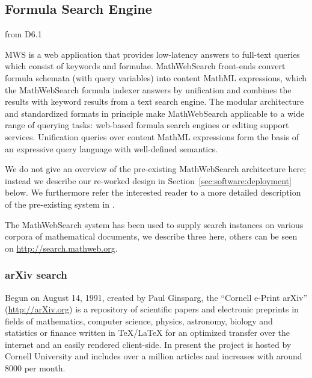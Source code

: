 \def\MWS{MathWebSearch\xspace}


\subsection{Formula Search Engine}


\begin{newpart}{from D6.1}

MWS is a web application that provides low-latency answers to full-text queries which consist of keywords and formulae.
\MWS front-ends convert formula schemata (with query variables) into content MathML expressions, which the \MWS formula indexer answers by unification and combines the results with keyword results from a text search engine.
The modular architecture and standardized formats in principle make \MWS applicable to a wide range of querying tasks:
web-based formula search engines or editing support services. 
Unification queries over content MathML expressions form the basis of an expressive query language with well-defined semantics.

We do not give an overview of the pre-existing \MWS architecture here; instead we describe our re-worked design in Section~\ref{sec:software:deployment} below. 
We furthermore refer the interested reader to a more detailed description of the pre-existing system in . 

The \MWS system has been used to supply search instances on various corpora of mathematical documents, we describe three here, others can be seen on \url{http://search.mathweb.org}. 

\subsubsection{arXiv search}

Begun on August 14, 1991, created by Paul Ginsparg, the ``Cornell e-Print arXiv''
(\url{http://arXiv.org}) is a repository of scientific papers and electronic preprints in
fields of mathematics, computer science, physics, astronomy, biology and statistics or
finance written in {\TeX/\LaTeX} for an optimized transfer over the internet and an easily
rendered client-side. In present the project is hosted by Cornell University and includes
over a million articles and increases with around 8000 per month.


\end{newpart}

